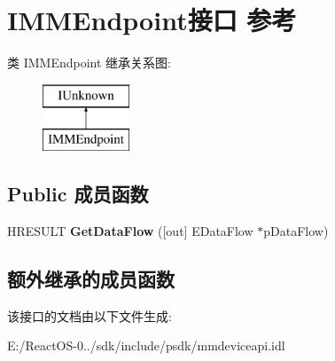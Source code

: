 \hypertarget{interface_i_m_m_endpoint}{}\section{I\+M\+M\+Endpoint接口 参考}
\label{interface_i_m_m_endpoint}
类 I\+M\+M\+Endpoint 继承关系图\+:\begin{figure}[H]
\begin{center}
\leavevmode
\includegraphics[height=2.000000cm]{interface_i_m_m_endpoint}
\end{center}
\end{figure}
\subsection*{Public 成员函数}
\begin{DoxyCompactItemize}
\item 
\mbox{\label{interface_i_m_m_endpoint_a5503b485c8963acd53c4b6469bd82997}} 
H\+R\+E\+S\+U\+LT {\bfseries Get\+Data\+Flow} (\mbox{[}out\mbox{]} E\+Data\+Flow $\ast$p\+Data\+Flow)
\end{DoxyCompactItemize}
\subsection*{额外继承的成员函数}


该接口的文档由以下文件生成\+:\begin{DoxyCompactItemize}
\item 
E\+:/\+React\+O\+S-\/0../sdk/include/psdk/mmdeviceapi.\+idl\end{DoxyCompactItemize}
